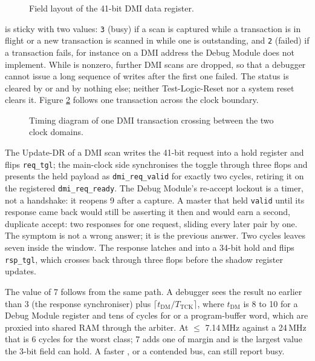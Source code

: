 \begin{figure}[htpb]
	\centering
	
	\caption{Field layout of the 41-bit DMI data register.}
	\label{fig:dmi-field}
\end{figure}

 is sticky with two values: \texttt{3} (busy) if a scan is captured while a transaction is in flight or a new transaction is scanned in while one is outstanding, and \texttt{2} (failed) if a transaction fails, for instance on a DMI address the Debug Module does not implement. While  is nonzero, further DMI scans are dropped, so that a debugger cannot issue a long sequence of writes after the first one failed. The status is cleared by  or  and by nothing else; neither Test-Logic-Reset nor a system reset clears it. Figure \ref{fig:dmi-crossing} follows one transaction across the clock boundary.

\begin{figure}[htpb]
	\centering
	
	\caption{Timing diagram of one DMI transaction crossing between the two clock domains.}
	\label{fig:dmi-crossing}
\end{figure}

The Update-DR of a DMI scan writes the 41-bit request into a hold register and flips \texttt{req\_tgl}; the main-clock side synchronises the toggle through three flops and presents the held payload as \texttt{dmi\_req\_valid} for exactly two cycles, retiring it on the registered \texttt{dmi\_req\_ready}. The Debug Module's re-accept lockout is a timer, not a handshake: it reopens 9  after a capture. A master that held \texttt{valid} until its response came back would still be asserting it then and would earn a second, duplicate accept: two responses for one request, sliding every later pair by one. The symptom is not a wrong answer; it is the previous answer. Two cycles leaves seven inside the window. The response latches  and  into a 34-bit hold and flips \texttt{rsp\_tgl}, which crosses back through three  flops before the shadow register updates.

The  value of 7 follows from the same path. A debugger sees the result no earlier than 3  (the response synchroniser) plus $\lceil t_{\mathrm{DM}} / T_{\mathrm{TCK}}\rceil$, where $t_{\mathrm{DM}}$ is 8 to 10  for a Debug Module register and tens of cycles for  or a program-buffer word, which are proxied into shared RAM through the arbiter. At  $\leq$ 7.14\,MHz against a 24\,MHz  that is 6 cycles for the worst class; 7 adds one of margin and is the largest value the 3-bit field can hold. A faster , or a contended bus, can still report busy.

